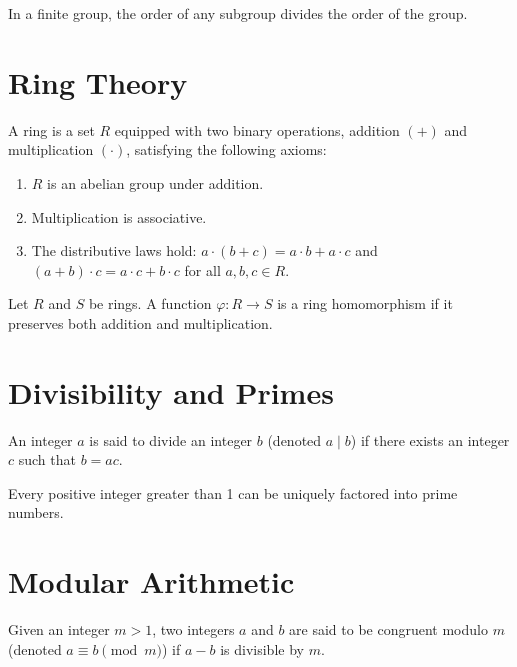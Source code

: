 \documentclass{article}
\begin{document}
\begin{theorem}
In a finite group, the order of any subgroup divides the order of the group.
\end{theorem}

\section{Ring Theory}

\begin{definition}
A ring is a set $R$ equipped with two binary operations, addition $(+)$ and multiplication $(\cdot)$, satisfying the following axioms:
\begin{enumerate}
    \item $R$ is an abelian group under addition.
    \item Multiplication is associative.
    \item The distributive laws hold: $a \cdot (b + c) = a \cdot b + a \cdot c$ and $(a + b) \cdot c = a \cdot c + b \cdot c$ for all $a, b, c \in R$.
\end{enumerate}
\end{definition}

\begin{theorem}
Let $R$ and $S$ be rings. A function $\varphi: R \rightarrow S$ is a ring homomorphism if it preserves both addition and multiplication.
\end{theorem}


\section{Divisibility and Primes}

\begin{definition}
An integer $a$ is said to divide an integer $b$ (denoted $a \mid b$) if there exists an integer $c$ such that $b = ac$.
\end{definition}

\begin{theorem}
Every positive integer greater than 1 can be uniquely factored into prime numbers.
\end{theorem}

\section{Modular Arithmetic}

\begin{definition}
Given an integer $m > 1$, two integers $a$ and $b$ are said to be congruent modulo $m$ (denoted $a \equiv b \pmod{m}$) if $a - b$ is divisible by $m$.
\end{definition}
\end{document}
